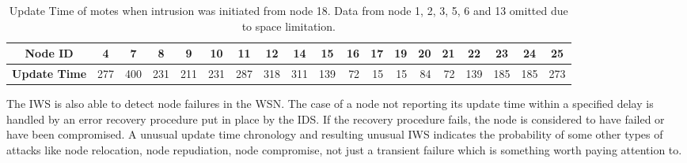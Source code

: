\documentclass[conference]{IEEEtran}
\newcommand*{\bd}[1]{\multicolumn{1}{|c|}{\bfseries #1}}
\begin{document}
\begin{table}[t!]
\centering
\begin{tabular}{|l|*{17}{r|}r|}
\hline
\bd{Node ID}           & \bd{4} & \bd{7} & \bd{8} & \bd{9} & \bd{10} & \bd{11} & \bd{12} & \bd{14} & \bd{15} & \bd{16} & \bd{17} & \bd{19} & \bd{20} & \bd{21} & \bd{22} & \bd{23} & \bd{24} & \bd{25}\\
\hline
\bd{Update Time}  &   277 	&  400 	& 231 	& 211 	& 231 &	 287 	& 318 &	 311 &	 139 & 72 &	 15 &	 15 &	 84 	& 72 	& 139 &	 185 &	185 & 273 \\
\hline
\end{tabular}
\caption{Update Time of motes when intrusion was initiated from node 18. Data from node 1, 2, 3, 5, 6 and 13 omitted due to space limitation.}
\label{tab:tree_time_18}
\end{table}


The IWS is also able to detect node failures in the WSN.
The case of a node not reporting its update time within a specified delay is handled by an error recovery procedure put in place by the IDS.
If the recovery procedure fails, the node is considered to have failed or have been compromised.
A unusual update time chronology and resulting unusual IWS  indicates the probability of some other types of attacks like node relocation, node repudiation, node compromise, not just a transient failure which is something worth paying attention to.
\end{document}
